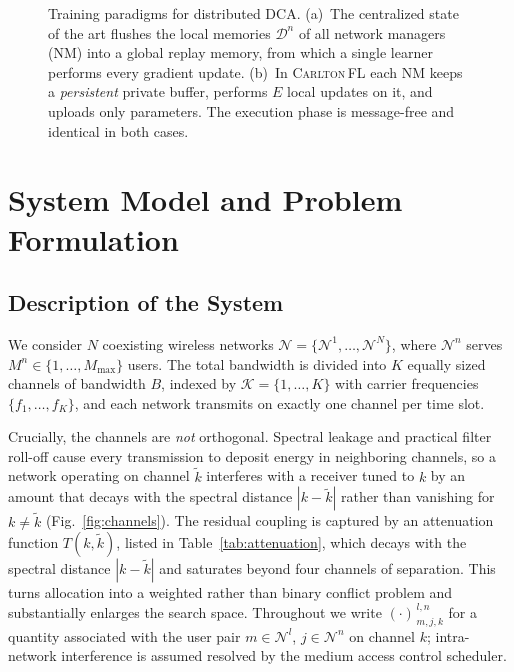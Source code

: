 \documentclass[journal]{IEEEtran}
\newcommand{\OURS}{\textsc{Carlton\,FL}}
\begin{document}
\begin{figure}[!t]
{\begin{tikzpicture}
\end{tikzpicture}}
\caption{Training paradigms for distributed DCA. (a)~The centralized state of
the art flushes the local memories $\mathcal{D}^{n}$ of all network managers
(NM) into a global replay memory, from which a single learner performs every
gradient update. (b)~In \OURS{} each NM keeps a \emph{persistent} private
buffer, performs $E$ local updates on it, and uploads only parameters. The
execution phase is message-free and identical in both cases.}
\label{fig:paradigms}
\end{figure}

\section{System Model and Problem Formulation}
\label{sec:model}

\subsection{Description of the System}
\label{subsec:model_system}

We consider $N$ coexisting wireless networks
$\mathcal{N}=\{\mathcal{N}^{1},\dots,\mathcal{N}^{N}\}$, where
$\mathcal{N}^{n}$ serves $M^{n}\in\{1,\dots,M_{\max}\}$ users. The total
bandwidth is divided into $K$ equally sized channels of bandwidth $B$, indexed
by $\mathcal{K}=\{1,\dots,K\}$ with carrier frequencies $\{f_{1},\dots,f_{K}\}$,
and each network transmits on exactly one channel per time slot.

Crucially, the channels are \emph{not} orthogonal. Spectral leakage and
practical filter roll-off cause every transmission to deposit energy in
neighboring channels, so a network operating on channel $\tilde{k}$ interferes
with a receiver tuned to $k$ by an amount that decays with the spectral
distance $|k-\tilde{k}|$ rather than vanishing for $k\neq\tilde{k}$
(Fig.~\ref{fig:channels}). The residual coupling is captured by an attenuation
function $T(k,\tilde{k})$, listed in Table~\ref{tab:attenuation}, which decays
with the spectral distance $|k-\tilde{k}|$ and saturates beyond four channels
of separation. This turns allocation into a
weighted rather than binary conflict problem and substantially enlarges the
search space. Throughout we write $(\cdot)^{\,l,n}_{\,m,j,k}$ for a quantity
associated with the user pair $m\in\mathcal{N}^{l}$, $j\in\mathcal{N}^{n}$ on
channel $k$; intra-network interference is assumed resolved by the medium
access control scheduler.
\end{document}
